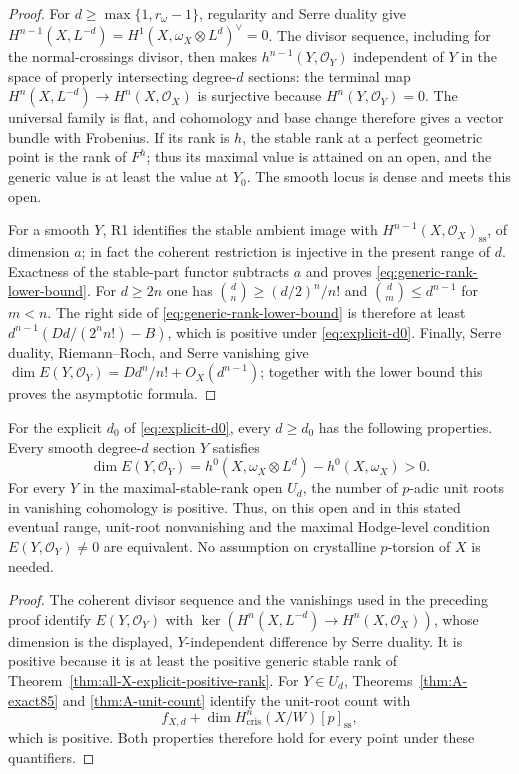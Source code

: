 \begin{proof}
For $d\geq\max\{1,r_\omega-1\}$, regularity and Serre duality give
$H^{n-1}(X,L^{-d})=H^1(X,\omega_X\otimes L^d)^\vee=0$.
The divisor sequence, including for the normal-crossings divisor,
then makes $h^{n-1}(Y,\mathcal O_Y)$ independent of $Y$ in the space of
properly intersecting degree-$d$ sections: the terminal map
$H^n(X,L^{-d})\to H^n(X,\mathcal O_X)$ is surjective because
$H^n(Y,\mathcal O_Y)=0$.  The universal family is
flat, and cohomology and base change therefore gives a vector bundle
with Frobenius.  If its rank is $h$, the stable rank at a perfect
geometric point is the rank of $F^h$; thus its maximal value is attained
on an open, and the generic value is at least the value at $Y_0$.
The smooth locus is dense and meets this open.

For a smooth $Y$, R1 identifies the stable ambient image with
$H^{n-1}(X,\mathcal O_X)_{\mathrm{ss}}$, of dimension $a$; in fact the
coherent restriction is injective in the present range of $d$.
Exactness of the stable-part functor subtracts $a$ and proves
\eqref{eq:generic-rank-lower-bound}.
For $d\geq2n$ one has
$\binom dn\geq(d/2)^n/n!$ and $\binom dm\leq d^{n-1}$ for $m<n$.
The right side of \eqref{eq:generic-rank-lower-bound} is therefore at
least $d^{n-1}(Dd/(2^nn!)-B)$, which is positive under
\eqref{eq:explicit-d0}.  Finally, Serre duality, Riemann--Roch, and
Serre vanishing give
$\dim E(Y,\mathcal O_Y)=Dd^n/n!+O_X(d^{n-1})$; together with the lower
bound this proves the asymptotic formula.
\end{proof}

\begin{corollary}
\label{cor:eventual-hodge-parenthesis}
For the explicit $d_0$ of \eqref{eq:explicit-d0}, every $d\geq d_0$
has the following properties.  Every smooth degree-$d$ section $Y$
satisfies
\[
 \dim E(Y,\mathcal O_Y)
 =h^0(X,\omega_X\otimes L^d)-h^0(X,\omega_X)>0.
\]
For every $Y$ in the maximal-stable-rank open $U_d$, the number of
$p$-adic unit roots in vanishing cohomology is positive.  Thus, on
this open and in this stated eventual range, unit-root nonvanishing
and the maximal Hodge-level condition $E(Y,\mathcal O_Y)\ne0$ are
equivalent.  No assumption on crystalline $p$-torsion of $X$ is needed.
\end{corollary}

\begin{proof}
The coherent divisor sequence and the vanishings used in the preceding
proof identify $E(Y,\mathcal O_Y)$ with
$\ker(H^n(X,L^{-d})\to H^n(X,\mathcal O_X))$, whose dimension is the
displayed, $Y$-independent difference by Serre duality.  It is positive
because it is at least the positive generic stable rank of
Theorem~\ref{thm:all-X-explicit-positive-rank}.
For $Y\in U_d$, Theorems~\ref{thm:A-exact85} and
\ref{thm:A-unit-count} identify the unit-root count with
\[
 f_{X,d}+\dim H^n_{\mathrm{cris}}(X/W)[p]_{\mathrm{ss}},
\]
which is positive.  Both properties therefore hold for every point
under these quantifiers.
\end{proof}


